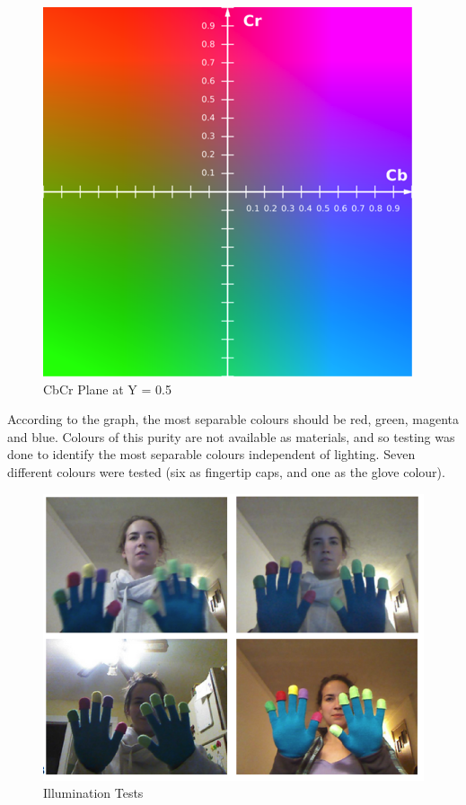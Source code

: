 \documentclass[12pt]{article}
\begin{document}
\begin{figure}[h]
  \centering
  \includegraphics[scale=1]{YUV.png}
  \caption{CbCr Plane at Y = 0.5}
  \label{fig:YUV}
\end{figure}

According to the graph, the most separable colours should be red, green, magenta and blue. Colours of this purity are not available as materials, and so testing was done to identify the most separable colours independent of lighting. Seven different colours were tested (six as fingertip caps, and one as the glove colour).

\begin{figure}[h]
  \centering
  \includegraphics[scale=1]{LightTest.png}
  \caption{Illumination Tests}
  \label{fig:light}
\end{figure}
\end{document}
